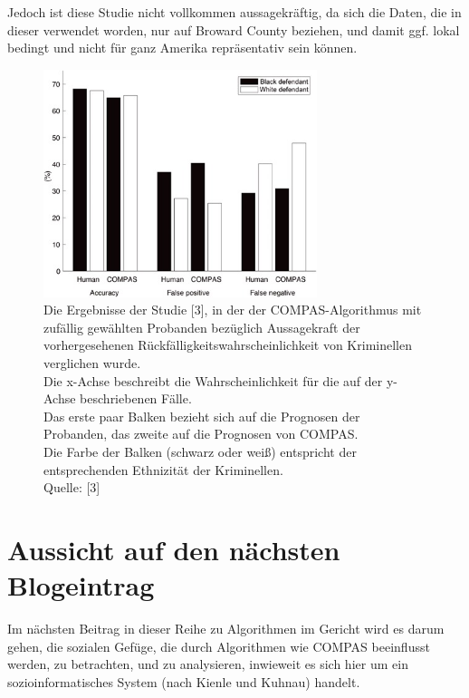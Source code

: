 \documentclass[10pt, a4paper, twocolumn]{article} %
\begin{document}
Jedoch ist diese Studie nicht vollkommen aussagekräftig, da sich die Daten, die in dieser verwendet worden, nur auf Broward County beziehen, und damit ggf. lokal bedingt und nicht für ganz Amerika repräsentativ sein können.
\begin{figure}[h]
\includegraphics[width=8cm]{image1}
\caption{Die Ergebnisse der Studie [3], in der der COMPAS-Algorithmus mit zufällig gewählten Probanden bezüglich Aussagekraft der vorhergesehenen Rückfälligkeitswahrscheinlichkeit von Kriminellen verglichen wurde.\\ 
Die x-Achse beschreibt die Wahrscheinlichkeit für die auf der y-Achse beschriebenen Fälle. \\
Das erste paar Balken bezieht sich auf die Prognosen der Probanden, das zweite auf die Prognosen von COMPAS. \\
Die Farbe der Balken (schwarz oder weiß) entspricht der entsprechenden Ethnizität der Kriminellen.\\
Quelle: [3] }
\label{img1}
\end{figure}

\section{Aussicht auf den nächsten Blogeintrag}
Im nächsten Beitrag in dieser Reihe zu Algorithmen im Gericht wird es darum gehen, die sozialen Gefüge, die durch Algorithmen wie COMPAS beeinflusst werden, zu betrachten, und zu analysieren, inwieweit es sich hier um ein sozioinformatisches System (nach Kienle und Kuhnau) handelt.
\end{document}
